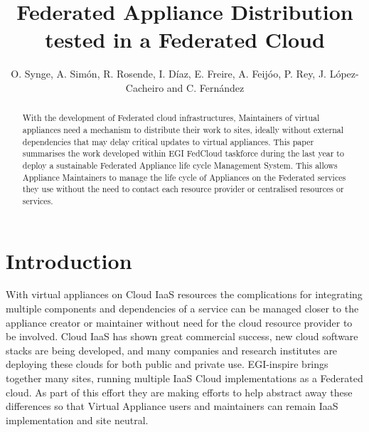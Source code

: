 \documentclass[oribibl]{llncs}
\begin{document}
%
\frontmatter          %
%
\pagestyle{headings}  %
%
\mainmatter              %
%
\title{Federated Appliance Distribution tested in a Federated Cloud}
%
%
\author{O. Synge, A. Sim\'on, R. Rosende, I. D\'iaz, E. Freire, A. Feij\'oo, P. Rey, J. L\'opez-Cacheiro and C. Fern\'andez}
%
%
%




\maketitle              %

\begin{abstract}
With the development of Federated cloud infrastructures, Maintainers of virtual appliances need a mechanism to distribute their work to sites, ideally without external dependencies that may delay critical updates to virtual appliances. This paper summarises the work developed within EGI FedCloud taskforce during the last year to deploy a sustainable Federated Appliance life cycle Management System. This allows Appliance Maintainers to manage the life cycle of Appliances on the Federated services they use without the need to contact each resource provider or centralised resources or services.
\end{abstract}

%
\section{Introduction}
\label{sect-introduction}
%
With virtual appliances on Cloud IaaS resources the complications for integrating multiple components and dependencies of a service can be managed closer to the appliance creator or maintainer without need for the cloud resource provider to be involved. Cloud IaaS has shown great commercial success, new cloud software stacks are being developed, and many companies and research institutes are deploying these clouds for both public and private use. EGI-inspire brings together many sites, running multiple IaaS Cloud implementations as a Federated cloud. As part of this effort they are making efforts to help abstract away these differences so that Virtual Appliance users and maintainers can remain IaaS implementation and site neutral.
\end{document}
